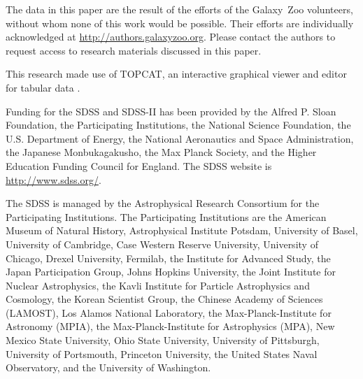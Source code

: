\documentclass{emulateapj}
\begin{document}

\acknowledgments

The data in this paper are the result of the efforts of the Galaxy~Zoo volunteers, without whom none of this work would be possible. Their efforts are individually acknowledged at \url{http://authors.galaxyzoo.org}. Please contact the authors to request access to research materials discussed in this paper. 

This research made use of TOPCAT, an interactive graphical viewer and editor for tabular data \citep{tay05}. 

Funding for the SDSS and SDSS-II has been provided by the Alfred P. Sloan Foundation, the Participating Institutions, the National Science Foundation, the U.S. Department of Energy, the National Aeronautics and Space Administration, the Japanese Monbukagakusho, the Max Planck Society, and the Higher Education Funding Council for England. The SDSS website is \url{http://www.sdss.org/}.

The SDSS is managed by the Astrophysical Research Consortium for the Participating Institutions. The Participating Institutions are the American Museum of Natural History, Astrophysical Institute Potsdam, University of Basel, University of Cambridge, Case Western Reserve University, University of Chicago, Drexel University, Fermilab, the Institute for Advanced Study, the Japan Participation Group, Johns Hopkins University, the Joint Institute for Nuclear Astrophysics, the Kavli Institute for Particle Astrophysics and Cosmology, the Korean Scientist Group, the Chinese Academy of Sciences (LAMOST), Los Alamos National Laboratory, the Max-Planck-Institute for Astronomy (MPIA), the Max-Planck-Institute for Astrophysics (MPA), New Mexico State University, Ohio State University, University of Pittsburgh, University of Portsmouth, Princeton University, the United States Naval Observatory, and the University of Washington.

\clearpage



\end{document}

